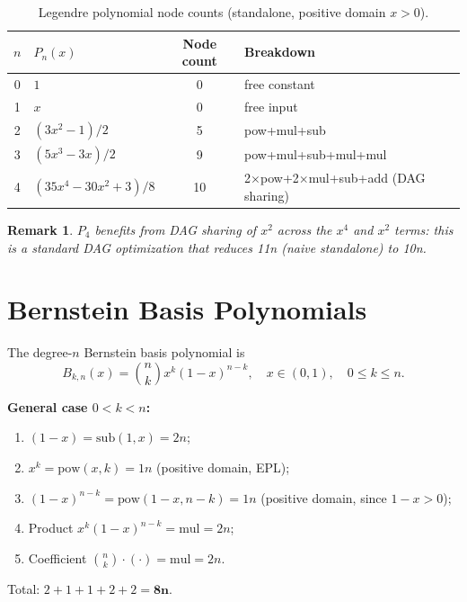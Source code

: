 \documentclass[11pt,a4paper]{article}
\newtheorem{remark}{Remark}[section]
\begin{document}
\begin{table}[h]
\centering
\caption{Legendre polynomial node counts (standalone, positive domain $x > 0$).}
\label{tab:legendre}
\begin{tabular}{clcl}
\toprule
$n$ & $P_n(x)$ & Node count & Breakdown \\
\midrule
0 & $1$                     & 0 & free constant \\
1 & $x$                     & 0 & free input \\
2 & $(3x^2-1)/2$            & 5 & pow+mul+sub \\
3 & $(5x^3-3x)/2$           & 9 & pow+mul+sub+mul+mul \\
4 & $(35x^4-30x^2+3)/8$     & 10 & 2$\times$pow+2$\times$mul+sub+add (DAG sharing) \\
\bottomrule
\end{tabular}
\end{table}

\begin{remark}
  $P_4$ benefits from DAG sharing of $x^2$ across the $x^4$ and $x^2$ terms: this is
  a standard DAG optimization that reduces 11n (naive standalone) to 10n.
\end{remark}

\section{Bernstein Basis Polynomials}

The degree-$n$ Bernstein basis polynomial is
\[
  B_{k,n}(x) = \binom{n}{k} x^k (1-x)^{n-k}, \quad x \in (0, 1), \quad 0 \leq k \leq n.
\]

\textbf{General case $0 < k < n$:}
\begin{enumerate}
  \item $(1-x) = \mathrm{sub}(1, x) = 2n$;
  \item $x^k = \mathrm{pow}(x, k) = 1n$ (positive domain, EPL);
  \item $(1-x)^{n-k} = \mathrm{pow}(1-x, n-k) = 1n$ (positive domain, since $1-x > 0$);
  \item Product $x^k (1-x)^{n-k} = \mathrm{mul} = 2n$;
  \item Coefficient $\binom{n}{k} \cdot (\cdot) = \mathrm{mul} = 2n$.
\end{enumerate}
Total: $2 + 1 + 1 + 2 + 2 = \mathbf{8n}$.
\end{document}
